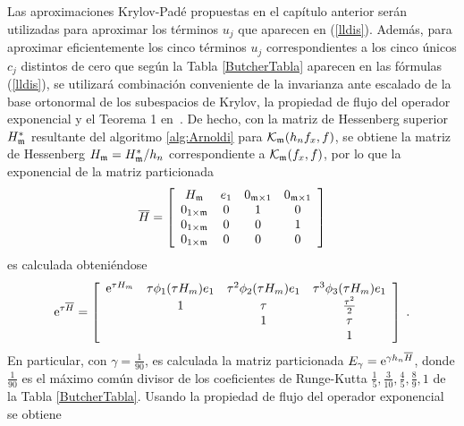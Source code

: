Las aproximaciones Krylov-Padé propuestas en el capítulo anterior serán utilizadas para aproximar los términos $u_j$ que aparecen en (\ref{lldis}). Además, para aproximar eficientemente los cinco términos $u_j$ correspondientes a los cinco únicos $c_j$ distintos de cero que según la Tabla \ref{ButcherTabla} aparecen en las fórmulas (\ref{lldis}), se utilizará combinación conveniente de la invarianza ante escalado de la base ortonormal de los subespacios de Krylov, la propiedad de flujo del operador exponencial y el Teorema 1 en~\cite{sidje1998expokit}. De hecho, con la matriz de Hessenberg superior $H^*_{\mathfrak{m}}$ resultante del algoritmo \ref{alg:Arnoldi} para $\mathcal{K}_{\mathfrak{m}}(h_nf_x,f)$, se obtiene la matriz de Hessenberg $H_{\mathfrak{m}}=H^*_{\mathfrak{m}}/h_n$ correspondiente a $\mathcal{K}_{\mathfrak{m}}(f_x,f)$, por lo que la exponencial de la matriz particionada
\begin{equation}
    \overline{H} = \left[\begin{array}{cccc}
    H_{\mathfrak{m}} & e_1 & 0_{\mathfrak{m}\times 1} & 0_{\mathfrak{m}\times 1}\\
    0_{1\times\mathfrak{m}} & 0 & 1 & 0\\
    0_{1\times\mathfrak{m}} & 0 & 0 & 1\\
    0_{1\times\mathfrak{m}} & 0 & 0 & 0
    \end{array}\right] \label{hhat}
\end{equation}
es calculada obteniéndose
\begin{equation}
    \mathrm{e}^{\tau\overline{H}} = \left[\begin{array}{cccc}
    \mathrm{e}^{\tau H_m} & \tau\phi_1(\tau H_m)e_1 & \tau^{2}\phi_2(\tau H_m)e_1 &
    \tau^{3}\phi_3(\tau H_m)e_1 \\
    & 1 & \tau & \frac{\tau^{2}}{2}\\
    &  & 1 & \tau \\
    &   &   & 1 \\
    \end{array}\right]\;. \label{phi_hhat}
\end{equation}
En particular, con $\gamma=\frac{1}{90}$, es calculada la matriz particionada $E_\gamma=\mathrm{e}^{\gamma h_n\overline{H}}$, donde $\frac{1}{ 90}$ es el máximo común divisor de los coeficientes de Runge-Kutta $\frac{1}{5},\frac{3}{10},\frac{4}{5},\frac{8}{9} ,1$ de la Tabla \ref{ButcherTabla}. Usando la propiedad de flujo del operador exponencial se obtiene

